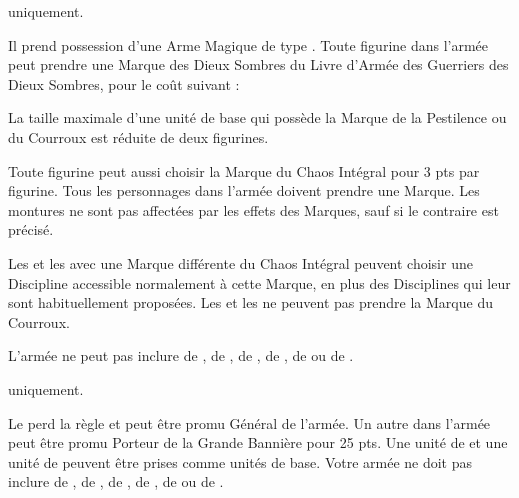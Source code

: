 \begin{multicols}{2}
\startpricelistNSP

\greatkhan{} uniquement.

Il prend possession d'une Arme Magique de type \ironfist{}. Toute figurine dans l'armée peut prendre une Marque des Dieux Sombres du Livre d'Armée des Guerriers des Dieux Sombres, pour le coût suivant :

 La taille maximale d'une unité de base qui possède la Marque de la Pestilence ou du Courroux est réduite de deux figurines.

Toute figurine peut aussi choisir la Marque du Chaos Intégral pour 3 pts par figurine. Tous les personnages dans l'armée doivent prendre une Marque. Les montures ne sont pas affectées par les effets des Marques, sauf si le contraire est précisé.

Les \shamans{} et les \greatshamans{} avec une Marque différente du Chaos Intégral peuvent choisir une Discipline accessible normalement à cette Marque, en plus des Disciplines qui leur sont habituellement proposées. Les \shamans{} et les \greatshamans{} ne peuvent pas prendre la Marque du Courroux.

L'armée ne peut pas inclure de \mammothhunters{}, de \scraplings{}, de \scraplingtrappers{}, de \yetis{}, de \sabretoothtigers{} ou de \scratapults{}.

\vspace*{\fill}\columnbreak
{}\mammothhunter{} uniquement.

Le \mammothhunter{} perd la règle \notaleader{} et peut être promu Général de l'armée. Un autre \mammothhunter{} dans l'armée peut être promu Porteur de la Grande Bannière pour 25 pts. Une unité de \yetis{} et une unité de \sabretoothtigers{} peuvent être prises comme unités de base. Votre armée ne doit pas inclure de \greatkhans{}, de \khans{}, de \bruisers{}, de \mercenaryveterans{}, de \bombardiers{} ou de \thundercannons{}.


\end{multicols}
